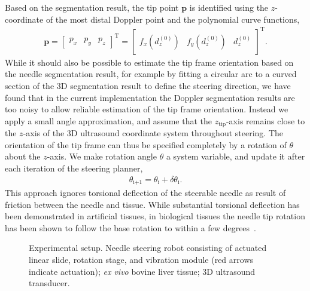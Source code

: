 Based on the segmentation result, the tip point $\bm{p}$ is identified using the $z$-coordinate of the most distal Doppler point and the polynomial curve functions,
\begin{align}
\bm{p} = \begin{bmatrix}p_x & p_y & p_z\end{bmatrix}^{\text{T}} = \begin{bmatrix}f_x(d^{(0)}_z) & f_y(d^{(0)}_z) & d^{(0)}_z \end{bmatrix}^{\text{T}}.
\end{align}
While it should also be possible to estimate the tip frame orientation based on the needle segmentation result, for example by fitting a circular arc to a curved section of the 3D segmentation result to define the steering direction, we have found that in the current implementation the Doppler segmentation results are too noisy to allow reliable estimation of the tip frame orientation. Instead we apply a small angle approximation, and assume that the $z_{\text{tip}}$-axis remains close to the $z$-axis of the 3D ultrasound coordinate system throughout steering. The orientation of the tip frame can thus be specified completely by a rotation of $\theta$ about the $z$-axis. We make rotation angle $\theta$ a system variable, and update it after each iteration of the steering planner, 
\begin{align}
\theta_\text{i+1} = \theta_\text{i} + \delta\theta_\text{i}.
\end{align}
This approach ignores torsional deflection of the steerable needle as result of friction between the needle and tissue. While substantial torsional deflection has been demonstrated in artificial tissues, in biological tissues the needle tip rotation has been shown to follow the base rotation to within a few degrees~\cite{Reed2008}. 

\begin{figure}[!t]
\caption{Experimental setup. Needle steering robot consisting of actuated linear slide, rotation stage, and vibration module (red arrows indicate actuation); \textit{ex vivo} bovine liver tissue; 3D ultrasound transducer.}
\label{fig:ExperimentalSetup}
\end{figure}

